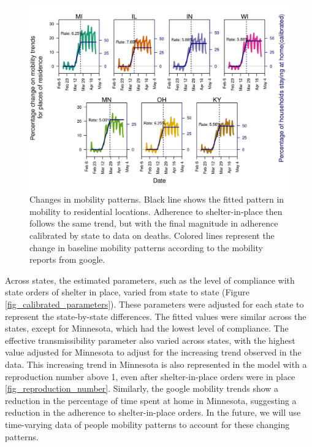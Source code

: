 \documentclass[11pt]{article}
\begin{document}
\begin{figure}[hb!]
\centering
\includegraphics[width=\textwidth]{../figures/report_figure_shelter_patterns.jpeg} 
\caption{\label{fig_google_shelter} Changes in mobility patterns. Black line shows the fitted pattern in mobility to residential locations. Adherence to shelter-in-place then follows the same trend, but with the final magnitude in adherence calibrated by state to data on deaths. Colored lines represent the change in baseline mobility patterns according to the mobility reports from google.}
\end{figure}


Across states, the estimated parameters, such as the level of compliance with state orders of shelter in place, varied from state to state (Figure \ref{fig_calibrated_parameters}). These parameters were adjusted for each state to represent the state-by-state differences. The fitted values were similar across the states, except for Minnesota, which had the lowest level of compliance. The effective transmissibility parameter also varied across states, with the highest value adjusted for Minnesota to adjust for the increasing trend observed in the data. This increasing trend in Minnesota is also represented in the model with a reproduction number above 1, even after shelter-in-place orders were in place \ref{fig_reproduction_number}. Similarly, the google mobility trends show a reduction in the percentage of time spent at home in Minnesota, suggesting a reduction in the adherence to shelter-in-place orders. In the future, we will use time-varying data of people mobility patterns to account for these changing patterns. 
\end{document}
